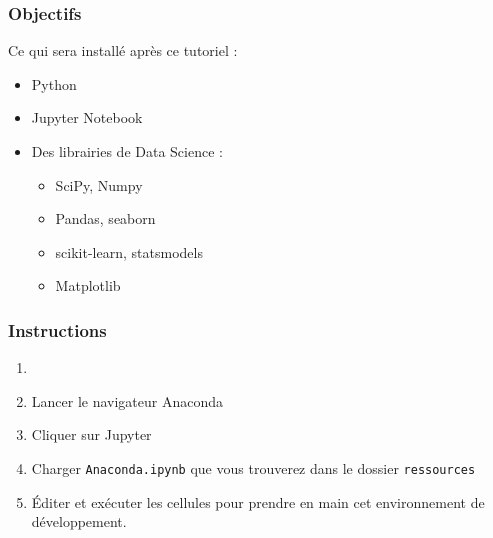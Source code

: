 \begin{frame}
  \frametitle{Objectifs}
  Ce qui sera installé après ce tutoriel :
  \begin{itemize}
  \item Python
  \item Jupyter Notebook
  \item Des librairies de \og{}Data Science\fg{} :
    \begin{itemize}
    \item SciPy, Numpy
    \item Pandas, seaborn
    \item scikit-learn, statsmodels
    \item Matplotlib
    \end{itemize}
  \end{itemize}
\end{frame}

\begin{frame}
  \frametitle{Instructions}
  \begin{enumerate}
  \item {}
  \item Lancer le navigateur Anaconda
  \item Cliquer sur Jupyter
  \item Charger \texttt{Anaconda.ipynb} que vous trouverez dans le dossier \texttt{ressources}
  \item Éditer et exécuter les cellules pour prendre en main cet environnement de développement.
  \end{enumerate}
\end{frame}
